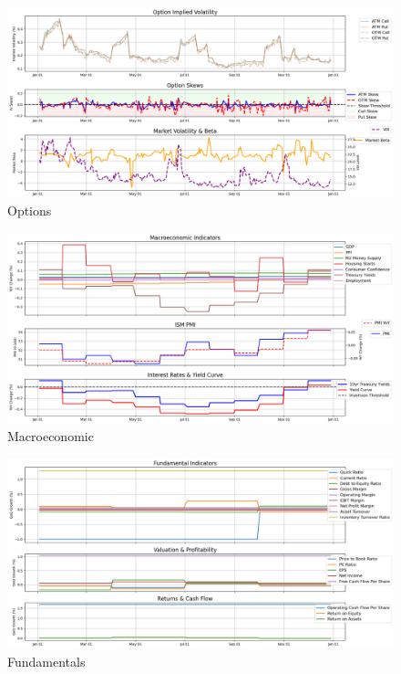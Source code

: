 \documentclass[8pt]{scrartcl}
\begin{document}
\begin{figure}[H]
    \centering
    \includegraphics[width=1\linewidth]{judge_reviews/GOOGL_M_gpt-4o-mini/2017-01-02/judge_Option_Implied_Volatility.png}
    \caption{Options}
\end{figure}

\begin{figure}[H]
    \centering
    \includegraphics[width=1\linewidth]{judge_reviews/GOOGL_M_gpt-4o-mini/2017-01-02/judge_Macroeconomic_Indicators.png}
    \caption{Macroeconomic}
\end{figure}

\begin{figure}[H]
    \centering
    \includegraphics[width=1\linewidth]{judge_reviews/GOOGL_M_gpt-4o-mini/2017-01-02/judge_Fundamental_Indicators.png}
    \caption{Fundamentals}
\end{figure}
\end{document}
